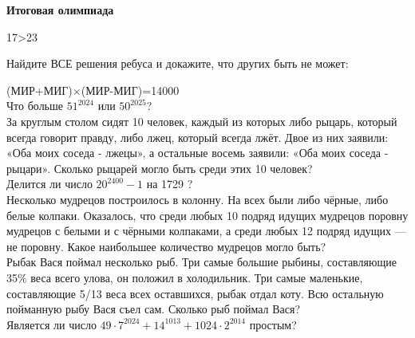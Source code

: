 \centerline{\bf \Huge Итоговая олимпиада}

\begin{flushright}
        \scriptsize{17>23}
\end{flushright}

 Найдите ВСЕ решения ребуса и докажите, что других быть не может: 

(МИР+МИГ)$\times$(МИР-МИГ)=14000\\

 Что больше $51^{2024}$ или $50^{2025}$?\\

 За круглым столом сидят 10 человек, каждый из которых либо рыцарь, который всегда говорит правду, либо лжец, который всегда лжёт. Двое из них заявили: «Оба моих соседа - лжецы», а остальные восемь заявили: «Оба моих соседа - рыцари». Сколько рыцарей могло быть среди этих 10 человек?\\

 Делится ли число $20^{2400}-1$ на 1729 ?\\

 Несколько мудрецов построилось в колонну. На всех были
либо чёрные, либо белые колпаки. Оказалось, что среди любых 10 подряд идущих мудрецов
поровну мудрецов с белыми и с чёрными колпаками, а среди любых 12 подряд идущих — не
поровну. Какое наибольшее количество мудрецов могло быть?\\

 Рыбак Вася поймал несколько рыб. Три самые большие рыбины,
составляющие 35\% веса всего улова, он положил в холодильник. Три самые маленькие, составляющие 5/13 веса всех оставшихся, рыбак отдал коту. Всю остальную пойманную рыбу Вася съел сам. Сколько рыб поймал Вася?\\

 Является ли число $49\cdot7^{2024}+14^{1013}+1024\cdot2^{2014}$ простым?\\